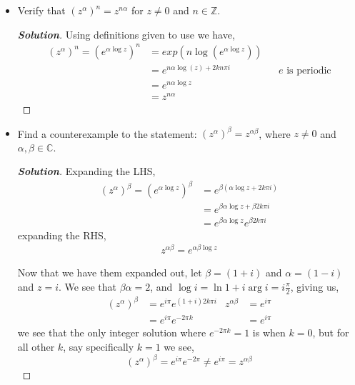 \documentclass[11pt]{article}
\newenvironment{problem}[2][Problem\!]{\begin{trivlist}
\item[\hskip \labelsep {\bfseries #1}\hskip \labelsep {\bfseries #2}]}{\end{trivlist}}
\newenvironment{solution}{\begin{proof}[\textbf{\textit{Solution}}] }{\end{proof}}
\newcommand{\zz}{\mathbb Z}   %
\newcommand{\cc}{\mathbb C}   %
\newcommand{\lrp}[1]{\left(#1\right)}
\begin{document}
\newpage  %

\begin{problem}{5.3}\hfill
\begin{itemize}[itemsep=3em]
\item[(a)] Verify that $(z^\alpha)^n = z^{n\alpha}$ for $z \neq 0$ and $n \in \zz$.
\begin{solution}
  Using definitions given to use we have,
  \begin{align*}
    \lrp{z^{\alpha}}^{n} = \lrp{e^{\alpha \log z}}^{n} &= exp({n\log(e^{\alpha\log z})}) \\
    &= e^{n\alpha \log(z) + 2kn\pi i } && e \text{ is periodic} \\
    &= e^{n\alpha \log z} \\
    &= z^{n\alpha}
  \end{align*}
\end{solution}

\item[(b)] Find a counterexample to the statement: $(z^{\alpha})^\beta = z^{\alpha\beta}$, where $z \neq 0$ and $\alpha,\beta \in \cc$.
\begin{solution}
  Expanding the LHS,
  \begin{align*}
    \lrp{z^{\alpha}}^{\beta} = \lrp{e^{\alpha\log z}}^{\beta} &= e^{\beta\lrp{\alpha \log z + 2k\pi i }} \\
    &= e^{\beta\alpha\log z + \beta2k\pi i } \\
    &= e^{\beta\alpha \log z}e^{\beta 2 k \pi i } 
  \end{align*}
  expanding the RHS,
  \begin{align*}
    z^{\alpha \beta} = e^{\alpha\beta \log z}
  \end{align*}

  Now that we have them expanded out, let $\beta = (1 +i)$ and $\alpha = (1-i)$ and $z = i$. We see that $\beta\alpha = 2$, and $\log i = \ln 1 + i \arg i = i\frac{\pi}{2}$, giving us,
  \begin{align*}
    \lrp{z^{\alpha}}^{\beta} &= e^{i\pi}e^{(1 +i)2 k \pi  i } & z^{\alpha\beta} &= e^{i\pi } \\
    &= e^{i \pi}e^{-2\pi k} & &=e^{i\pi}
  \end{align*}
  we see that the only integer solution where $e^{-2\pi k} = 1$ is when $k = 0$, but for all other $k$, say specifically $k = 1$ we see,
  \[\lrp{z^{\alpha}}^{\beta} = e^{i\pi}e^{-2\pi} \neq e^{i\pi} = z^{\alpha\beta}\]
\end{solution}

\end{itemize}
\end{problem}
\end{document}
